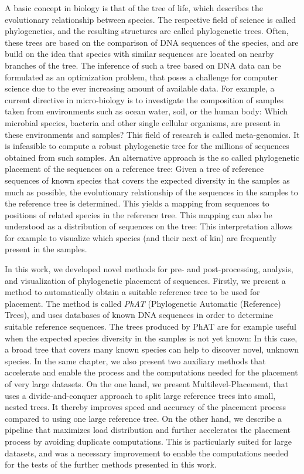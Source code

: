 A basic concept in biology is that of the tree of life, which describes the evolutionary relationship between species.
The respective field of science is called phylogenetics, and the resulting structures are called phylogenetic trees.
Often, these trees are based on the comparison of DNA sequences of the species,
and are build on the idea that species with similar sequences are located on nearby branches of the tree.
The inference of such a tree based on DNA data can be formulated as an optimization problem,
that poses a challenge for computer science due to the ever increasing amount of available data.
For example, a current directive in micro-biology is to investigate the composition of samples
taken from environments such as ocean water, soil, or the human body:
Which microbial species, bacteria and other single cellular organisms, are present in these environments and samples?
This field of research is called meta-genomics.
It is infeasible to compute a robust phylogenetic tree for the millions of sequences obtained from such samples.
An alternative approach is the so called phylogenetic placement of the sequences on a reference tree:
Given a tree of reference sequences of known species that covers the expected diversity in the samples as much as possible,
the evolutionary relationship of the sequences in the samples to the reference tree is determined.
This yields a mapping from sequences to positions of related species in the reference tree.
This mapping can also be understood as a distribution of sequences on the tree:
This interpretation allows for example to visualize
which species (and their next of kin) are frequently present in the samples.

In this work, we developed novel methods for pre- and post-processing, analysis, and visualization
of phylogenetic placement of sequences.
Firstly, we present a method to automatically obtain a suitable reference tree to be used for placement.
The method is called \emph{PhAT} (Phylogenetic Automatic (Reference) Trees),
and uses databases of known DNA sequences in order to determine suitable reference sequences.
The trees produced by PhAT are for example useful when the expected species diversity in the samples is not yet known:
In this case, a broad tree that covers many known species can help to discover novel, unknown species.
In the same chapter, we also present two auxiliary methods that accelerate and enable the process and the computations
needed for the placement of very large datasets.
On the one hand, we present Multilevel-Placement, that uses a divide-and-conquer approach to split large reference trees
into small, nested trees.
It thereby improves speed and accuracy of the placement process compared to using one large reference tree.
On the other hand, we describe a pipeline that maximizes load distribution and further accelerates the placement process
by avoiding duplicate computations.
This is particularly suited for large datasets, and was a necessary improvement to enable the computations needed
for the tests of the further methods presented in this work.


